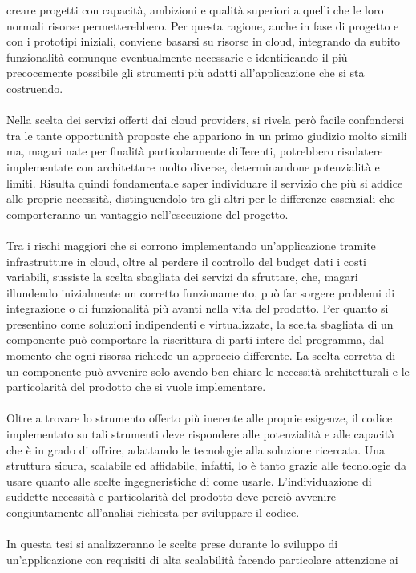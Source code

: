 creare progetti con capacità, ambizioni e qualità superiori a quelli che le loro normali risorse permetterebbero.
Per questa ragione, anche in fase di progetto e con i prototipi iniziali, conviene basarsi su risorse in cloud, 
integrando da subito funzionalità comunque eventualmente necessarie e 
identificando il più precocemente possibile gli strumenti più adatti all'applicazione che si sta costruendo.\\
\\
Nella scelta dei servizi offerti dai cloud providers, si rivela però facile confondersi tra le tante opportunità proposte
che appariono in un primo giudizio molto simili ma, magari nate per finalità particolarmente differenti,
potrebbero risulatere implementate con architetture molto diverse, determinandone potenzialità e limiti.
Risulta quindi fondamentale saper individuare il servizio che più si addice alle proprie necessità, 
distinguendolo tra gli altri per le differenze essenziali che comporteranno un vantaggio nell'esecuzione del progetto.\\
\\
Tra i rischi maggiori che si corrono implementando un'applicazione tramite infrastrutture in cloud,
oltre al perdere il controllo del budget dati i costi variabili, sussiste la scelta sbagliata dei servizi da sfruttare, che, 
magari illundendo inizialmente un corretto funzionamento, può far sorgere problemi di integrazione o di funzionalità 
più avanti nella vita del prodotto.
Per quanto si presentino come soluzioni indipendenti e virtualizzate, 
la scelta sbagliata di un componente può comportare la riscrittura di parti intere del programma,
dal momento che ogni risorsa richiede un approccio differente.
La scelta corretta di un componente può avvenire solo avendo ben chiare le necessità architetturali e le particolarità del prodotto che si vuole implementare.\\
\\
Oltre a trovare lo strumento offerto più inerente alle proprie esigenze, 
il codice implementato su tali strumenti deve rispondere alle potenzialità e alle capacità che è in grado di offrire, 
adattando le tecnologie alla soluzione ricercata.
Una struttura sicura, scalabile ed affidabile, infatti, lo è tanto grazie alle tecnologie da usare quanto alle scelte ingegneristiche di come usarle.
L'individuazione di suddette necessità e particolarità del prodotto deve perciò avvenire congiuntamente all'analisi richiesta per sviluppare il codice.\\
\\
In questa tesi si analizzeranno le scelte prese durante lo sviluppo di un'applicazione con requisiti di alta scalabilità facendo particolare attenzione ai  \\

